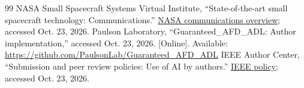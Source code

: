 \begin{thebibliography}{99}
 NASA Small Spacecraft Systems Virtual Institute, ``State-of-the-art small spacecraft technology: Communications.'' \href{https://www.nasa.gov/smallsat-institute/sst-soa/soa-communications/}{NASA communications overview}; accessed Oct. 23, 2026.
 Paulson Laboratory, ``Guaranteed\_AFD\_ADL: Author implementation,'' accessed Oct. 23, 2026. [Online]. Available: \url{https://github.com/PaulsonLab/Guaranteed_AFD_ADL}
 IEEE Author Center, ``Submission and peer review policies: Use of AI by authors.'' \href{https://journals.ieeeauthorcenter.ieee.org/become-an-ieee-journal-author/publishing-ethics/guidelines-and-policies/submission-and-peer-review-policies/}{IEEE policy}; accessed Oct. 23, 2026.
\end{thebibliography}
